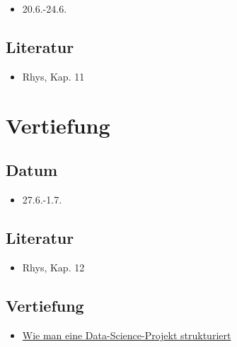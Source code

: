 \documentclass[
]{book}
\providecommand{\tightlist}{%
  \setlength{\itemsep}{0pt}\setlength{\parskip}{0pt}}
\begin{document}
\begin{itemize}
\tightlist
\item
  20.6.-24.6.
\end{itemize}

\hypertarget{literatur-12}{%
\subsection{Literatur}\label{literatur-12}}

\begin{itemize}
\tightlist
\item
  Rhys, Kap. 11
\end{itemize}

\hypertarget{vertiefung-2}{%
\section{Vertiefung}\label{vertiefung-2}}

\hypertarget{datum-14}{%
\subsection{Datum}\label{datum-14}}

\begin{itemize}
\tightlist
\item
  27.6.-1.7.
\end{itemize}

\hypertarget{literatur-13}{%
\subsection{Literatur}\label{literatur-13}}

\begin{itemize}
\tightlist
\item
  Rhys, Kap. 12
\end{itemize}

\hypertarget{vertiefung-3}{%
\subsection{Vertiefung}\label{vertiefung-3}}

\begin{itemize}
\tightlist
\item
  \href{https://medium.com/swlh/how-to-structure-a-python-based-data-science-project-a-short-tutorial-for-beginners-7e00bff14f56}{Wie man eine Data-Science-Projekt strukturiert}
\end{itemize}
\end{document}
